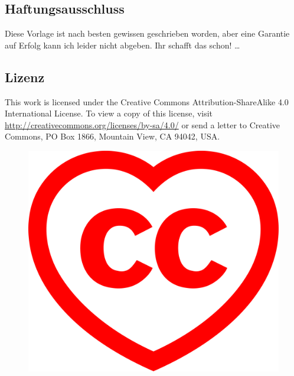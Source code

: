 \subsection{Haftungsausschluss}%
\label{sec:haftausschl}
Diese Vorlage ist nach besten gewissen geschrieben worden, aber eine Garantie auf Erfolg kann ich leider nicht abgeben. Ihr schafft das schon!
\dots%
\subsection{Lizenz}%
\label{sec:licence}
This work is licensed under the Creative Commons Attribution-ShareAlike 4.0 International License. To view a copy of this license, visit \href{http://creativecommons.org/licenses/by-sa/4.0/}{http://creativecommons.org/licenses/by-sa/4.0/} or send a letter to Creative Commons, PO Box 1866, Mountain View, CA 94042, USA.
\begin{figure}[hb]
  \centering
  \includegraphics[width=0.7\columnwidth]{graphics/ccheart_red.pdf}
\end{figure}%
